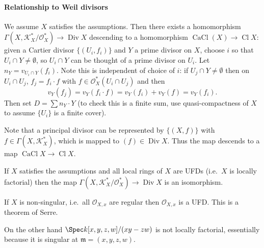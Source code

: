 \documentclass[a4paper]{article}
\newcommand{\sh}[1]{\mathcal{#1}} %
\DeclareMathOperator{\Div}{Div} %
\DeclareMathOperator{\Cl}{Cl} %
\DeclareMathOperator{\CaCl}{CaCl} %
\begin{document}
\paragraph{Relationship to Weil divisors}

We assume \(X\) satisfies the assumptions. Then there exists a homomorphism \(\Gamma(X, \sh K_X^*/\sh O_X^*) \to \Div X\) descending to a homomorphism \(\CaCl(X) \to \Cl X\): given a Cartier divisor \(\{(U_i, f_i)\}\) and \(Y\) a prime divisor on \(X\), choose \(i\) so that \(U_i \cap Y \neq \emptyset\), so \(U_i \cap Y\) can be thought of a prime divisor on \(U_i\). Let \(n_Y = v_{U_i \cap Y}(f_i)\). Note this is independent of choice of \(i\): if \(U_j \cap Y \neq \emptyset\) then on \(U_i \cap U_j\), \(f_j = f_i \cdot f\) with \(f \in \sh O_X^*(U_i \cap U_j)\) and then
\[
  v_Y(f_j) = v_Y(f_i \cdot f) = v_Y(f_i) + v_Y(f) = v_Y(f_i).
\]
Then set \(D = \sum n_Y \cdot Y\) (to check this is a finite sum, use quasi-compactness of \(X\) to assume \(\{U_i\}\) is a finite cover).

Note that a principal divisor can be represented by \(\{(X, f)\}\) with \(f \in \Gamma(X, \sh K_X^*)\), which is mapped to \((f) \in \Div X\). Thus the map descends to a map \(\CaCl X \to \Cl X\).

\begin{proposition}
  If \(X\) satisfies the assumptions and all local rings of \(X\) are UFDs (i.e.\ \(X\) is locally factorial) then the map \(\Gamma(X, \sh K_X^*/\sh O_X^*) \to \Div X\) is an isomorphism.
\end{proposition}

\begin{remark}
  If \(X\) is non-singular, i.e.\ all \(\sh O_{X, x}\) are regular then \(\sh O_{X, x}\) is a UFD. This is a theorem of Serre.

  On the other hand \(\Spec k[x, y, z, w]/(xy - zw)\) is not locally factorial, essentially because it is singular at \(\mathfrak m = (x, y, z, w)\).
\end{remark}
\end{document}
